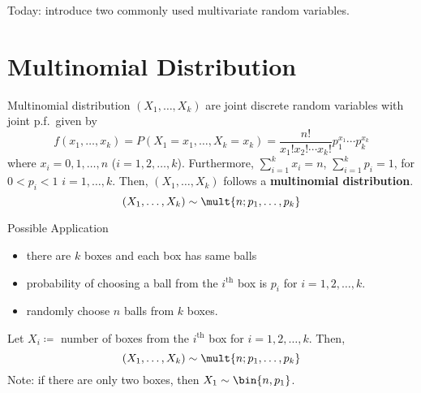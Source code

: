 Today: introduce two commonly
used multivariate random variables.
\section{Multinomial Distribution}
\begin{Definition}{Multinomial distribution}{}
    $ (X_1,\ldots,X_k) $ are joint discrete
    random variables with joint p.f.\ given by
    \[ f(x_1,\ldots,x_k)=P(X_1=x_1,\ldots,X_k=x_k)=
        \frac{n!}{x_1!x_2!\cdots x_k!}p_1^{x_1}\cdots p_k^{x_k} \]
    where $ x_i=0,1,\ldots,n $ ($ i=1,2,\ldots,k $). Furthermore,
    $ \sum_{i=1}^{k}x_i=n $, $ \sum_{i=1}^{k} p_i=1 $,
    for $ 0<p_i<1 $ $ i=1,\ldots,k $. Then,
    $ (X_1,\ldots,X_k) $ follows a \textbf{multinomial distribution}.
    \[ (X_1,\ldots,X_k)\sim \mult{n;p_1,\ldots,p_k} \]
\end{Definition}
\begin{Example}{Possible Application}{}
    \begin{itemize}
        \item there are $ k $ boxes and each box
              has same balls
        \item probability of choosing a ball from the
              $ i^{\text{th}} $ box is $ p_i $ for $ i=1,2,\ldots,k $.
        \item randomly choose $ n $ balls from $ k $ boxes.
    \end{itemize}
    Let $ X_i\coloneq $ number of boxes from the
    $ i^{\text{th}} $ box for $ i=1,2,\ldots,k $. Then,
    \[ (X_1,\ldots,X_k) \sim \mult{n;p_1,\ldots,p_k} \]
    Note: if there are only two boxes, then $ X_1\sim \bin{n,p_1} $.
\end{Example}
